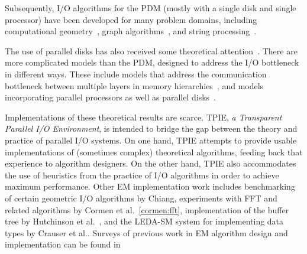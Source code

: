Subsequently, I/O algorithms for the PDM (mostly with a
single disk and single processor) have been developed for
many problem domains, including computational
geometry~\cite{goodrich:external,arge:buffer,arge:theory,arge:gis,aamvv-empgbtag97,arge:interval,kanellakis:indexing,ramaswamy:path,subramanian:p-range,vengroff:efficient,agarwal:efficient,zhu:further,agarwal:point,arge:scalable,arge:theory,callahan:topology,franciosa:orders,grossi:cross-tree},
 graph
algorithms~\cite{chiang:external,arge:buffer,kumar:improved,abello:functional,crauser:randomized,arge:obdd,feuerstein:memory,nodine:blocking,ullman:input},
 and string
processing~\cite{ferragina:fully,ferragina:fast,arge:strings,crauser:construction}.

The use of parallel disks
 has also received
some theoretical
attention~\cite{vitter:algorithmsI,nodine:deterministic,nodine:greed,dehne:efficient,dehne:reducing}.
There are more complicated models than the PDM, designed to
address the I/O bottleneck in different ways. These include
models that address the communication bottleneck between
multiple layers in
memory hierarchies~\cite{}, and models incorporating
parallel processors as well as parallel
disks~\cite{dehne:efficient,dehne:reducing}.

Implementations of these theoretical results are scarce.
TPIE, {\em a Transparent Parallel I/O Environment}, is
intended to bridge the gap between the theory and practice
of parallel I/O systems. On one hand, TPIE attempts to
provide usable implementations of (sometimes complex)
theoretical algorithms, feeding back that experience to
algorithm designers. On the other hand, TPIE also
accommodates the use of heuristics from the practice of I/O
algorithms in order to achieve maximum performance. Other EM
implementation work includes benchmarking of certain
geometric I/O algorithms by Chiang\cite{chiang:experiments},
experiments with FFT and related algorithms by Cormen et
al.~\ref{cormen:fft}, implementation of the buffer tree by
Hutchinson et al.~\cite{hutchinson:early}, and the LEDA-SM
system for implementing data types by Crauser et al.\cite{}.
Surveys of previous work in EM algorithm design and
implementation can be found
in~\cite{arge:gisbook,arge:thesis,vitter:podssurvey,vitter:extdatassurvey}

